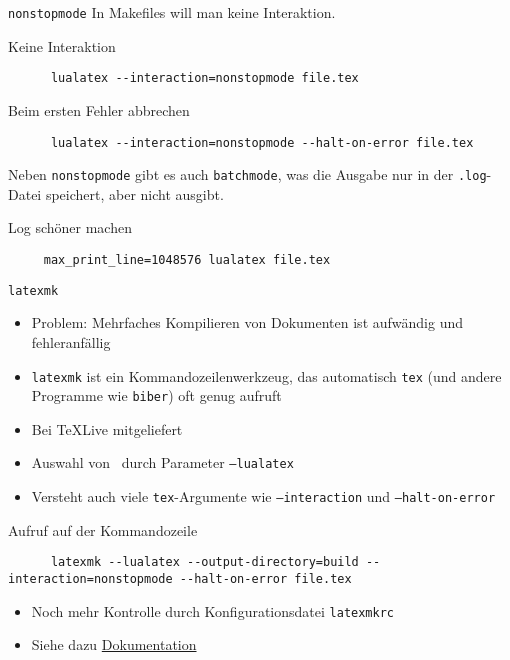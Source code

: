 
\begin{frame}[fragile]{\texttt{nonstopmode}}
  In Makefiles will man keine Interaktion.

  \begin{block}{Keine Interaktion}
    \begin{verbatim}
      lualatex --interaction=nonstopmode file.tex
    \end{verbatim}
  \end{block}

  \begin{block}{Beim ersten Fehler abbrechen}
    \begin{verbatim}
      lualatex --interaction=nonstopmode --halt-on-error file.tex
    \end{verbatim}
  \end{block}

  Neben \texttt{nonstopmode} gibt es auch \texttt{batchmode}, was die Ausgabe nur in der \texttt{.log}-Datei speichert, aber nicht ausgibt.

  \begin{block}{Log schöner machen}
    \begin{verbatim}
     max_print_line=1048576 lualatex file.tex
    \end{verbatim}
  \end{block}
\end{frame}

\begin{frame}[fragile]{
  \texttt{latexmk}
  \hfill
}
  \begin{itemize}
    \item Problem: Mehrfaches Kompilieren von Dokumenten ist aufwändig und fehleranfällig
    \item \texttt{latexmk} ist ein Kommandozeilenwerkzeug, das automatisch \texttt{tex} (und andere Programme wie \texttt{biber}) oft genug aufruft
    \item Bei TeXLive mitgeliefert
    \item Auswahl von \LuaLaTeX\ durch Parameter \texttt{--lualatex}
    \item Versteht auch viele \texttt{tex}-Argumente wie \texttt{--interaction} und \texttt{--halt-on-error}
  \end{itemize}

  \begin{block}{Aufruf auf der Kommandozeile}
    \begin{verbatim}
      latexmk --lualatex --output-directory=build --interaction=nonstopmode --halt-on-error file.tex
    \end{verbatim}
  \end{block}

  \begin{itemize}
    \item Noch mehr Kontrolle durch Konfigurationsdatei \texttt{latexmkrc}
    \item Siehe dazu \href{http://mirrors.ctan.org/support/latexmk/latexmk.pdf}{Dokumentation}
  \end{itemize}
\end{frame}

